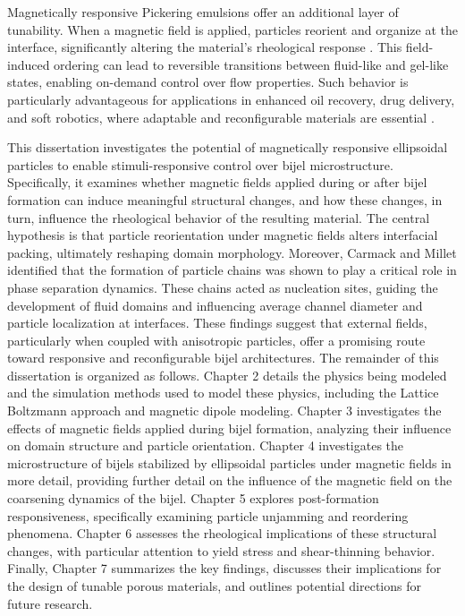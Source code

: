 Magnetically responsive Pickering emulsions offer an additional layer of tunability. When a magnetic field is applied, particles reorient and organize at the interface, significantly altering the material's 
rheological response \cite{qiao_magnetorheological_2012, melle_pickering_2005}. This field-induced ordering can lead to reversible transitions between fluid-like and gel-like states, enabling on-demand control 
over flow properties. Such behavior is particularly advantageous for applications in enhanced oil recovery, drug delivery, and soft robotics, where adaptable and reconfigurable materials are essential 
\cite{tham_magnetophoresis_2021}.

This dissertation investigates the potential of magnetically responsive ellipsoidal particles to enable stimuli-responsive control over bijel microstructure. Specifically, it examines whether magnetic fields 
applied during or after bijel formation can induce meaningful structural changes, and how these changes, in turn, influence the rheological behavior of the resulting material. The central hypothesis is that 
particle reorientation under magnetic fields alters interfacial packing, ultimately reshaping domain morphology. 
Moreover, Carmack and Millet identified that the formation of particle chains was shown to play a critical role in phase separation dynamics. These chains acted as nucleation sites, guiding the development of 
fluid domains and influencing average channel diameter and particle localization at interfaces. These findings suggest that external fields, particularly when coupled with anisotropic particles, offer a 
promising route toward responsive and reconfigurable bijel architectures.
The remainder of this dissertation is organized as follows. Chapter 2 details the physics being modeled and the simulation methods used to model these physics, including the Lattice Boltzmann approach 
and magnetic dipole modeling. Chapter 3 investigates the effects of magnetic fields applied during bijel formation, analyzing their influence on domain structure and particle orientation. 
Chapter 4 investigates the microstructure of bijels stabilized by ellipsoidal particles under magnetic fields in more detail, providing further detail on the influence of the magnetic field on
the coarsening dynamics of the bijel.
Chapter 5 explores 
post-formation responsiveness, specifically examining particle unjamming and reordering phenomena. Chapter 6 assesses the rheological implications of these structural changes, with particular attention to 
yield stress and shear-thinning behavior. Finally, Chapter 7 summarizes the key findings, discusses their implications for the design of tunable porous materials, and outlines potential directions for future 
research.

